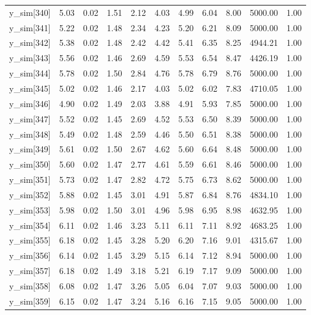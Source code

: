 \begin{table}[ht]
\begin{tabular}{rrrrrrrrrrr}
  y\_sim[340] & 5.03 & 0.02 & 1.51 & 2.12 & 4.03 & 4.99 & 6.04 & 8.00 & 5000.00 & 1.00 \\ 
  y\_sim[341] & 5.22 & 0.02 & 1.48 & 2.34 & 4.23 & 5.20 & 6.21 & 8.09 & 5000.00 & 1.00 \\ 
  y\_sim[342] & 5.38 & 0.02 & 1.48 & 2.42 & 4.42 & 5.41 & 6.35 & 8.25 & 4944.21 & 1.00 \\ 
  y\_sim[343] & 5.56 & 0.02 & 1.46 & 2.69 & 4.59 & 5.53 & 6.54 & 8.47 & 4426.19 & 1.00 \\ 
  y\_sim[344] & 5.78 & 0.02 & 1.50 & 2.84 & 4.76 & 5.78 & 6.79 & 8.76 & 5000.00 & 1.00 \\ 
  y\_sim[345] & 5.02 & 0.02 & 1.46 & 2.17 & 4.03 & 5.02 & 6.02 & 7.83 & 4710.05 & 1.00 \\ 
  y\_sim[346] & 4.90 & 0.02 & 1.49 & 2.03 & 3.88 & 4.91 & 5.93 & 7.85 & 5000.00 & 1.00 \\ 
  y\_sim[347] & 5.52 & 0.02 & 1.45 & 2.69 & 4.52 & 5.53 & 6.50 & 8.39 & 5000.00 & 1.00 \\ 
  y\_sim[348] & 5.49 & 0.02 & 1.48 & 2.59 & 4.46 & 5.50 & 6.51 & 8.38 & 5000.00 & 1.00 \\ 
  y\_sim[349] & 5.61 & 0.02 & 1.50 & 2.67 & 4.62 & 5.60 & 6.64 & 8.48 & 5000.00 & 1.00 \\ 
  y\_sim[350] & 5.60 & 0.02 & 1.47 & 2.77 & 4.61 & 5.59 & 6.61 & 8.46 & 5000.00 & 1.00 \\ 
  y\_sim[351] & 5.73 & 0.02 & 1.47 & 2.82 & 4.72 & 5.75 & 6.73 & 8.62 & 5000.00 & 1.00 \\ 
  y\_sim[352] & 5.88 & 0.02 & 1.45 & 3.01 & 4.91 & 5.87 & 6.84 & 8.76 & 4834.10 & 1.00 \\ 
  y\_sim[353] & 5.98 & 0.02 & 1.50 & 3.01 & 4.96 & 5.98 & 6.95 & 8.98 & 4632.95 & 1.00 \\ 
  y\_sim[354] & 6.11 & 0.02 & 1.46 & 3.23 & 5.11 & 6.11 & 7.11 & 8.92 & 4683.25 & 1.00 \\ 
  y\_sim[355] & 6.18 & 0.02 & 1.45 & 3.28 & 5.20 & 6.20 & 7.16 & 9.01 & 4315.67 & 1.00 \\ 
  y\_sim[356] & 6.14 & 0.02 & 1.45 & 3.29 & 5.15 & 6.14 & 7.12 & 8.94 & 5000.00 & 1.00 \\ 
  y\_sim[357] & 6.18 & 0.02 & 1.49 & 3.18 & 5.21 & 6.19 & 7.17 & 9.09 & 5000.00 & 1.00 \\ 
  y\_sim[358] & 6.08 & 0.02 & 1.47 & 3.26 & 5.05 & 6.04 & 7.07 & 9.03 & 5000.00 & 1.00 \\ 
  y\_sim[359] & 6.15 & 0.02 & 1.47 & 3.24 & 5.16 & 6.16 & 7.15 & 9.05 & 5000.00 & 1.00 \\ 

\end{tabular}
\end{table}
